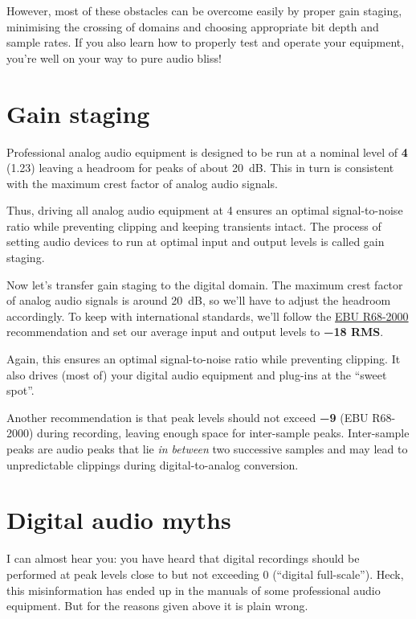 However, most of these obstacles can be overcome easily by proper gain
staging, minimising the crossing of domains and choosing appropriate
bit depth and sample rates.  If you also learn how to properly test
and operate your equipment, you're well on your way to pure audio
bliss!

\section{Gain staging}
\label{sec:gain_staging}

Professional analog audio equipment is designed to be run at a nominal
level of \textbf{\SI[addsign=all]{+4}{\dBu}} (\SI{1.23}{\VRMS})
leaving a headroom for peaks of about \SI{20}{\dB}.  This in turn is
consistent with the maximum crest factor of analog audio signals.

Thus, driving all analog audio equipment at \SI[addsign=all]{+4}{\dBu}
ensures an optimal signal-to-noise ratio while preventing clipping and
keeping transients intact.  The process of setting audio devices to
run at optimal input and output levels is called gain staging.

Now let's transfer gain staging to the digital domain.  The maximum
crest factor of analog audio signals is around \SI{20}{\dB}, so we'll
have to adjust the headroom accordingly.  To keep with international
standards, we'll follow the
\href{http://tech.ebu.ch/publications/r068}{EBU R68-2000}
recommendation and set our average input and output levels to
\textbf{\SI{-18}{\dBFS} RMS}.

Again, this ensures an optimal signal-to-noise ratio while preventing
clipping.  It also drives (most of) your digital audio equipment and
plug-ins at the ``sweet spot''.

Another recommendation is that peak levels should not exceed
\textbf{\SI{-9}{\dBFS}} (EBU R68-2000) during recording, leaving
enough space for inter-sample peaks.  Inter-sample peaks are audio
peaks that lie \emph{in between} two successive samples and may lead
to unpredictable clippings during digital-to-analog conversion.

\section{Digital audio myths}
\label{sec:digital_audio_myths}

I can almost hear you: you have heard that digital recordings should
be performed at peak levels close to but not exceeding \SI{0}{\dBFS}
(``digital full-scale'').  Heck, this misinformation has ended up in
the manuals of some professional audio equipment.  But for the reasons
given above it is plain wrong.

